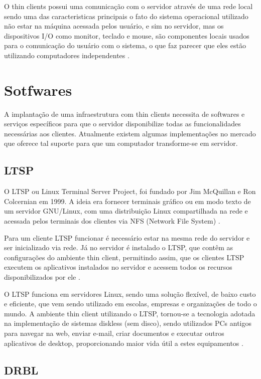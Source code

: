 \documentclass[
	12pt,				%
	openright,			%
	twoside,			%
	a4paper,			%
	chapter=TITLE,		%
	english,			%
	brazil				%
	]{abntex2}
\begin{document}
O thin clients possui uma comunicação com o servidor através de uma rede local sendo uma das caracteristicas principais o fato do sistema operacional utilizado não estar na máquina acessada pelos usuário, e sim no servidor, mas os dispositivos I/O como monitor, teclado e mouse, são componentes locais usados para o comunicação do usuário com o sistema, o que faz parecer que eles estão utilizando computadores independentes \cite{richards2007linux, ComoFuncionaThinClient}.


\section{Sotfwares}

A implantação de uma infraestrutura com thin clients necessita de softwares e serviços específicos para que o servidor disponibilize todas as funcionalidades necessárias aos clientes. Atualmente existem algumas implementações no mercado que oferece tal suporte para que um computador transforme-se em servidor.


\subsection{LTSP}

O LTSP ou Linux Terminal Server Project, foi fundado por Jim McQuillan e Ron Colcernian em 1999. A ideia era fornecer terminais gráfico ou em modo texto de um servidor GNU/Linux, com uma distribuição Linux compartilhada na rede e acessada pelos terminais dos clientes via NFS (Network File System) \cite{piaui}. 

Para um cliente LTSP funcionar é necessário estar na mesma rede do servidor e ser inicializado via rede.  Já no servidor é instalado o LTSP, que contêm as configurações do ambiente thin client, permitindo assim,  que os clientes LTSP executem os aplicativos instalados no servidor e acessem todos os recursos disponibilizados por ele \cite{piaui}.

O LTSP funciona em servidores Linux, sendo uma solução flexível, de baixo custo e eficiente, que vem sendo utilizado em escolas, empresas e organizações de todo o mundo. A ambiente thin client utilizando o LTSP, tornou-se a tecnologia adotada na implementação de sistemas diskless (sem disco), sendo utilizados PCs antigos para navegar na web, enviar e-mail, criar documentos e executar outros aplicativos de desktop, proporcionando maior vida útil a estes equipamentos \cite{piaui,ltsp}.


\subsection{DRBL}
\end{document}
